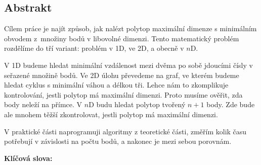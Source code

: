 \subsection*{Abstrakt}

Cílem práce je najít způsob, jak nalézt polytop maximální dimenze s minimálním obvodem z~množiny bodů v libovolné dimenzi. Tento matematický problém rozdělíme do tří variant: problém v 1D, ve 2D, a obecně v $n$D.

V 1D budeme hledat minimální vzdálenost mezi dvěma po sobě jdoucími čísly v seřazené množině bodů. Ve 2D úlohu převedeme na graf, ve kterém budeme hledat cyklus s minimální váhou a délkou tři. Lehce nám to zkomplikuje kontrolování, jestli polytop má maximální dimenzi. Proto musíme ověřit, zda body neleží na přímce. V $n$D budu hledat polytop tvořený $n+1$ body. Zde bude ale mnohem těžší zkontrolovat, jestli polytop má maximální dimenzi.

V praktické části naprogramuji algoritmy z teoretické části, změřím kolik času potřebují v závislosti na počtu bodů, a nakonec je mezi sebou porovnám. 

\vspace{1em}
\noindent
\textbf{Klíčová slova: }\keywordscz

